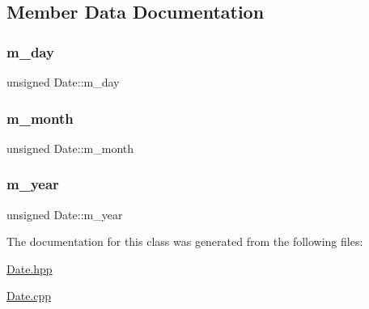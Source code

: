 \subsection{Member Data Documentation}
\mbox{\label{classDate_acb66f968e19f1f20a55001d2a88beb69}} 
\subsubsection{\texorpdfstring{m\+\_\+day}{m\_day}}
{\footnotesize\ttfamily unsigned Date\+::m\+\_\+day\hspace{0.3cm}{\ttfamily [private]}}

\mbox{\label{classDate_a856644d57cd0c87254c108cb1d85444c}} 
\subsubsection{\texorpdfstring{m\+\_\+month}{m\_month}}
{\footnotesize\ttfamily unsigned Date\+::m\+\_\+month\hspace{0.3cm}{\ttfamily [private]}}

\mbox{\label{classDate_ad326b89685e94f61827d4822ffcdefd3}} 
\subsubsection{\texorpdfstring{m\+\_\+year}{m\_year}}
{\footnotesize\ttfamily unsigned Date\+::m\+\_\+year\hspace{0.3cm}{\ttfamily [private]}}



The documentation for this class was generated from the following files\+:\begin{DoxyCompactItemize}
\item 
\hyperlink{Date_8hpp}{Date.\+hpp}\item 
\hyperlink{Date_8cpp}{Date.\+cpp}\end{DoxyCompactItemize}
